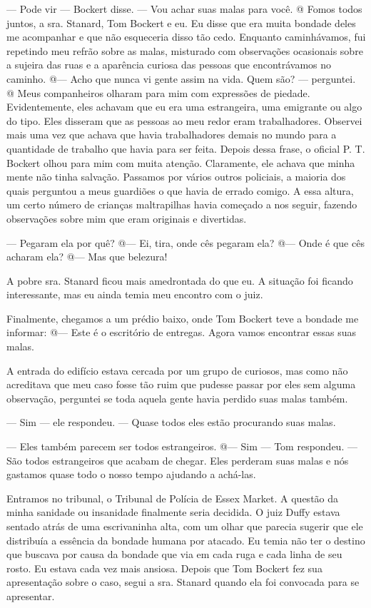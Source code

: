 --- Pode vir --- Bockert disse. --- Vou achar suas malas para você. @
Fomos todos juntos, a sra. Stanard, Tom Bockert e eu. Eu disse que era
muita bondade deles me acompanhar e que não esqueceria disso tão cedo.
Enquanto caminhávamos, fui repetindo meu refrão sobre as malas,
misturado com observações ocasionais sobre a sujeira das ruas e a
aparência curiosa das pessoas que encontrávamos no caminho. @--- Acho
que nunca vi gente assim na vida. Quem são? --- perguntei. @ Meus
companheiros olharam para mim com expressões de piedade. Evidentemente,
eles achavam que eu era uma estrangeira, uma emigrante ou algo do tipo.
Eles disseram que as pessoas ao meu redor eram trabalhadores. Observei
mais uma vez que achava que havia trabalhadores demais no mundo para a
quantidade de trabalho que havia para ser feita. Depois dessa frase, o
oficial P. T. Bockert olhou para mim com muita atenção. Claramente, ele
achava que minha mente não tinha salvação. Passamos por vários outros
policiais, a maioria dos quais perguntou a meus guardiões o que havia de
errado comigo. A essa altura, um certo número de crianças maltrapilhas
havia começado a nos seguir, fazendo observações sobre mim que eram
originais e divertidas.

--- Pegaram ela por quê? @--- Ei, tira, onde cês pegaram ela? @--- Onde
é que cês acharam ela? @--- Mas que belezura!

A pobre sra. Stanard ficou mais amedrontada do que eu. A situação foi
ficando interessante, mas eu ainda temia meu encontro com o juiz.

Finalmente, chegamos a um prédio baixo, onde Tom Bockert teve a bondade
me informar: @--- Este é o escritório de entregas. Agora vamos encontrar
essas suas malas.

A entrada do edifício estava cercada por um grupo de curiosos, mas como
não acreditava que meu caso fosse tão ruim que pudesse passar por eles
sem alguma observação, perguntei se toda aquela gente havia perdido suas
malas também.

--- Sim --- ele respondeu. --- Quase todos eles estão procurando suas
malas.

--- Eles também parecem ser todos estrangeiros. @--- Sim --- Tom
respondeu. --- São todos estrangeiros que acabam de chegar. Eles
perderam suas malas e nós gastamos quase todo o nosso tempo ajudando a
achá-las.

Entramos no tribunal, o Tribunal de Polícia de Essex Market. A questão
da minha sanidade ou insanidade finalmente seria decidida. O juiz Duffy
estava sentado atrás de uma escrivaninha alta, com um olhar que parecia
sugerir que ele distribuía a essência da bondade humana por atacado. Eu
temia não ter o destino que buscava por causa da bondade que via em cada
ruga e cada linha de seu rosto. Eu estava cada vez mais ansiosa. Depois
que Tom Bockert fez sua apresentação sobre o caso, segui a sra. Stanard
quando ela foi convocada para se apresentar.


